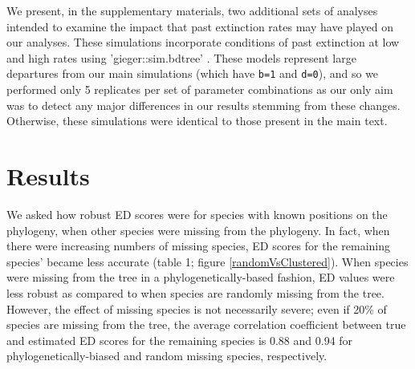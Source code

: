 \documentclass[10pt,english]{article}
\begin{document}
We present, in the supplementary materials, two additional sets of analyses
intended to examine the impact that past extinction rates may have played on our
analyses. These simulations incorporate conditions of past extinction at low and
high rates using 'gieger::sim.bdtree' \autocite[setting parameters for low
extinction at \texttt{b=1} and \texttt{d=0.5} and high extinction \texttt{b=1}
and \texttt{d=0.95};][]{Pennell2014}. These models represent large departures
from our main simulations (which have \texttt{b=1} and \texttt{d=0}), and so we
performed only 5 replicates per set of parameter combinations as our only aim
was to detect any major differences in our results stemming from these changes.
Otherwise, these simulations were identical to those present in the main text.


\section*{Results}
We asked how robust ED scores were for species with known positions on the
phylogeny, when other species were missing from the phylogeny. In fact, when
there were increasing numbers of missing species, ED scores for the remaining
species’ became less accurate (table 1; figure \ref{randomVsClustered}). When
species were missing from the tree in a phylogenetically-based fashion, ED
values were less robust as compared to when species are randomly missing from
the tree. However, the effect of missing species is not necessarily severe; even
if 20\% of species are missing from the tree, the average correlation
coefficient between true and estimated ED scores for the remaining species is
0.88 and 0.94 for phylogenetically-biased and random missing species,
respectively.
\end{document}
